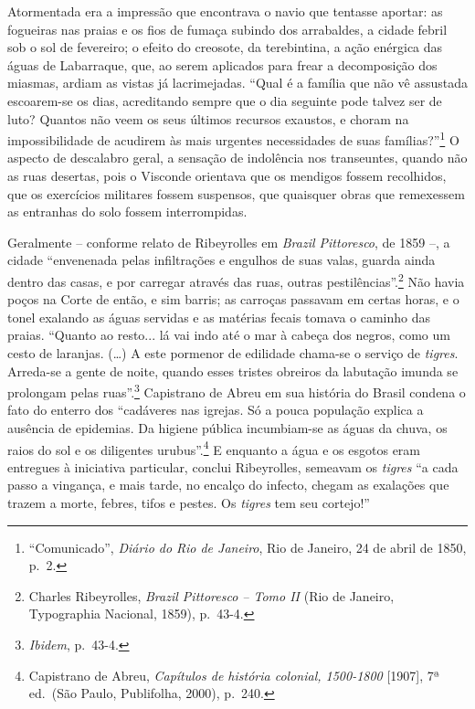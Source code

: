 Atormentada era a impressão que encontrava o navio que tentasse aportar:
as fogueiras nas praias e os fios de fumaça subindo dos arrabaldes, a
cidade febril sob o sol de fevereiro; o efeito do creosote, da
terebintina, a ação enérgica das águas de Labarraque, que, ao serem
aplicados para frear a decomposição dos miasmas, ardiam as vistas já
lacrimejadas. ``Qual é a família que não vê assustada escoarem-se os
dias, acreditando sempre que o dia seguinte pode talvez ser de luto?
Quantos não veem os seus últimos recursos exaustos, e choram na
impossibilidade de acudirem às mais urgentes necessidades de suas
famílias?''\footnote{``Comunicado'', \emph{Diário do Rio de Janeiro},
  Rio de Janeiro, 24 de abril de 1850, p.~2.} O aspecto de descalabro
geral, a sensação de indolência nos transeuntes, quando não as ruas
desertas, pois o Visconde orientava que os mendigos fossem recolhidos,
que os exercícios militares fossem suspensos, que quaisquer obras que
remexessem as entranhas do solo fossem interrompidas.

Geralmente -- conforme relato de Ribeyrolles em \emph{Brazil
Pittoresco}, de 1859 --, a cidade ``envenenada pelas infiltrações e
engulhos de suas valas, guarda ainda dentro das casas, e por carregar
através das ruas, outras pestilências''.\footnote{Charles Ribeyrolles,
  \emph{Brazil Pittoresco -- Tomo II} (Rio de Janeiro, Typographia
  Nacional, 1859), p.~43-4.} Não havia poços na Corte de então, e sim
barris; as carroças passavam em certas horas, e o tonel exalando as
águas servidas e as matérias fecais tomava o caminho das praias.
``Quanto ao resto... lá vai indo até o mar à cabeça dos negros, como um
cesto de laranjas. (\ldots{}) A este pormenor de edilidade chama-se o
serviço de \emph{tigres}. Arreda-se a gente de noite, quando esses
tristes obreiros da labutação imunda se prolongam pelas
ruas''.\footnote{\emph{Ibidem}, p.~43-4.} Capistrano de Abreu em sua
história do Brasil condena o fato do enterro dos ``cadáveres nas
igrejas. Só a pouca população explica a ausência de epidemias. Da
higiene pública incumbiam-se as águas da chuva, os raios do sol e os
diligentes urubus''.\footnote{Capistrano de Abreu, \emph{Capítulos de
  história colonial, 1500-1800} {[}1907{]}, 7ª ed.~(São Paulo,
  Publifolha, 2000), p.~240.} E enquanto a água e os esgotos eram
entregues à iniciativa particular, conclui Ribeyrolles, semeavam os
\emph{tigres} ``a cada passo a vingança, e mais tarde, no encalço do
infecto, chegam as exalações que trazem a morte, febres, tifos e pestes.
Os \emph{tigres} tem seu cortejo!''

